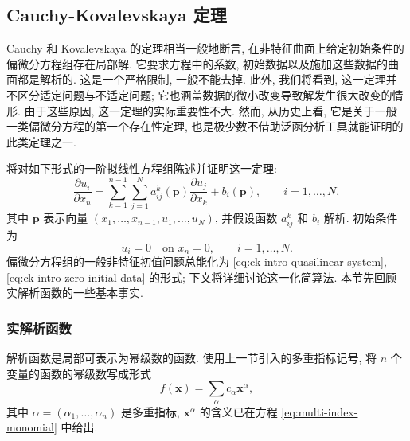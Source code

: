 \subsection{Cauchy-Kovalevskaya 定理}\label{sec:cauchy-kovalevskaya}

Cauchy 和 Kovalevskaya 的定理相当一般地断言, 在非特征曲面上给定初始条件的偏微分方程组存在局部解. 它要求方程中的系数, 初始数据以及施加这些数据的曲面都是解析的. 这是一个严格限制, 一般不能去掉. 此外, 我们将看到, 这一定理并不区分适定问题与不适定问题; 它也涵盖数据的微小改变导致解发生很大改变的情形. 由于这些原因, 这一定理的实际重要性不大. 然而, 从历史上看, 它是关于一般一类偏微分方程的第一个存在性定理, 也是极少数不借助泛函分析工具就能证明的此类定理之一.

将对如下形式的一阶拟线性方程组陈述并证明这一定理:
\begin{equation}\label{eq:ck-intro-quasilinear-system}
\dfrac{\partial u_i}{\partial x_n}=\sum_{k=1}^{n-1}\sum_{j=1}^Na_{ij}^k(\bm{p})\dfrac{\partial u_j}{\partial x_k}+b_i(\bm{p}),\qquad i=1,\ldots,N,
\end{equation}
其中 $\bm{p}$ 表示向量 $(x_1,\ldots,x_{n-1},u_1,\ldots,u_N)$, 并假设函数 $a_{ij}^k$ 和 $b_i$ 解析. 初始条件为
\begin{equation}\label{eq:ck-intro-zero-initial-data}
u_i=0\quad\text{on }x_n=0,\qquad i=1,\ldots,N.
\end{equation}
偏微分方程组的一般非特征初值问题总能化为 \eqref{eq:ck-intro-quasilinear-system}, \eqref{eq:ck-intro-zero-initial-data} 的形式; 下文将详细讨论这一化简算法. 本节先回顾实解析函数的一些基本事实.

\subsubsection{实解析函数}\label{subsec:real-analytic-functions}

解析函数是局部可表示为幂级数的函数. 使用上一节引入的多重指标记号, 将 $n$ 个变量的函数的幂级数写成形式
\begin{equation}\label{eq:multivariable-power-series}
f(\bm{x})=\sum_\alpha c_\alpha\bm{x}^{\alpha},
\end{equation}
其中 $\alpha=(\alpha_1,\ldots,\alpha_n)$ 是多重指标, $\bm{x}^{\alpha}$ 的含义已在方程 \eqref{eq:multi-index-monomial} 中给出.

